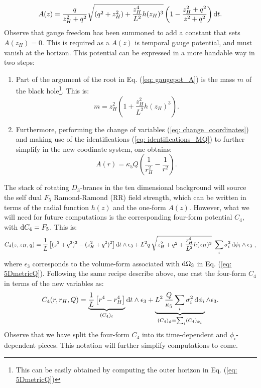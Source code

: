 \begin{equation}\label{eq: gaugepot_A}
 A(z) = \frac{q}{z_H^2+q^2}\sqrt{ \left(q^2+z_H^2 \right) + \frac{z_H^4}{L^2} h(z_H)^3} \left(1-\frac{z_H^2+q^2}{z^2+q^2}\right) \text{d} t.
\end{equation}
Observe that gauge freedom has been summoned to add a constant that sets $A(z_H) = 0$. This is required as a $A(z)$ is temporal gauge potential, and must vanish at the horizon. This potential can be expressed in a more handable way in two steps:
\begin{enumerate}
    \item Part of the argument of the root in Eq. (\ref{eq: gaugepot_A}) is the mass $m$ of the black hole\footnote{This can be easily obtained by computing the outer horizon in Eq. (\ref{eq: 5DmetricQ})}. This is:
    \begin{equation}
        m = z_{H}^{2}\left(1 + \frac{z_{H}^{2}}{L^{2}}h(z_{H})^{3}\right).
    \end{equation}
    \item Furthermore, performing the change of variables (\ref{eq: change_coordinates}) and making use of the identifications (\ref{eq: identifications_MQ}) to further simplify in the new coodinate system, one obtains:
    \begin{equation}\label{eq: gaugepot_A_new_coordinates}
        A(r) = \kappa_{5} Q \left(\frac{1}{r_{H}^{2}} - \frac{1}{r^{2}}\right).
    \end{equation}
\end{enumerate}
The stack of rotating $D_{3}$-branes in the ten dimensional background will source the self dual $F_{5}$ Ramond-Ramond (RR) field strength, which can be written in terms of the radial function $h(z)$ and the one-form $A(z)$. However, what we will need for future computations is the corresponding four-form potential $C_{4}$, with $\text{d} C_{4}=F_{5}$. This is:
\begin{equation}\label{eq: C4_pot_old}
C_4 (z, z_{H}, q) = \frac{1}{L}\left[(z^2+q^2)^2 - (z_H^2+q^2)^2\right] \text{d} t \wedge \epsilon_3 + L^2 q \: \sqrt{ z_H^2 + q^2 + \frac{z_H^4}{L^2} h(z_H)^3}\ \sum_i \sigma_i^2\, \text{d} \phi_i \wedge \epsilon_3 \ ,
\end{equation}
where $\epsilon_{3}$ corresponds to the volume-form associated with $\text{d} \Omega_{3}$ in Eq. (\ref{eq: 5DmetricQ}). Following the same recipe describe above, one cast the four-form $C_{4}$ in terms of the new variables as:
\begin{equation}\label{eq: C4_pot_new}
    C_4 (r, r_{H}, Q) = \underbrace{\frac{1}{L}\left[r^4 - r_{H}^{4}\right]}_{(C_{4})_{t}} \text{d} t \wedge \epsilon_3 + \underbrace{L^2 \: \frac{Q}{\kappa_{5}} \sum_i \sigma_i^2\, \text{d} \phi_i}_{(C_4)_{\phi}=\sum_i(C_4)_{\phi_i}} \wedge \epsilon_3.
\end{equation}
Observe that we have split the four-form $C_{4}$ into its time-dependent and $\phi_{i}$-dependent pieces. This notation will further simplify computations to come. 

